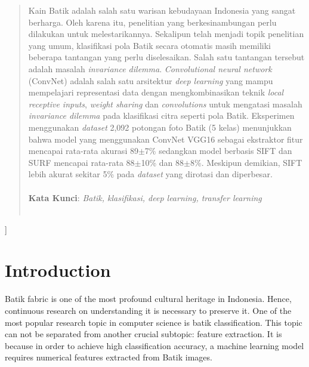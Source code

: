 \documentclass[conference, compsoc]{IEEEtran}
\begin{document}
{	\renewcommand{\abstractname}{Abstrak}
	\begin{abstract}
		\noindent
		\normalfont 
		Kain Batik adalah salah satu warisan kebudayaan Indonesia yang sangat berharga. Oleh karena itu, penelitian yang berkesinambungan perlu dilakukan untuk melestarikannya. Sekalipun telah menjadi topik penelitian yang umum, klasifikasi pola Batik secara otomatis masih memiliki beberapa tantangan yang perlu diselesaikan. Salah satu tantangan tersebut adalah masalah \textit{invariance dilemma}. \textit{Convolutional neural network} (ConvNet) adalah salah satu arsitektur \textit{deep learning} yang mampu mempelajari representasi data dengan mengkombinasikan teknik \textit{local receptive inputs}, \textit{weight sharing} dan \textit{convolutions} untuk mengatasi masalah \textit{invariance dilemma} pada klasifikasi citra seperti pola Batik. Eksperimen menggunakan \textit{dataset} 2,092 potongan foto Batik (5 kelas) menunjukkan bahwa model yang menggunakan ConvNet VGG16 sebagai ekstraktor fitur mencapai rata-rata akurasi 89$\pm$7\% sedangkan model berbasis SIFT dan SURF mencapai rata-rata 88$\pm$10\% dan 88$\pm$8\%. Meskipun demikian, SIFT lebih akurat sekitar 5\% pada \textit{dataset} yang dirotasi dan diperbesar.
		\\\\
		\noindent
		\textbf{Kata Kunci}: \textit{Batik, klasifikasi, deep learning, transfer learning} \\\\
	\end{abstract}
	
}
]

%
\IEEEpeerreviewmaketitle

\section{Introduction}

Batik fabric is one of the most profound cultural heritage in Indonesia. Hence, continuous research on understanding it is necessary to preserve it. One of the most popular research topic in computer science is batik classification. This topic can not be separated from another crucial subtopic: feature extraction. It is because in order to achieve high classification accuracy, a machine learning model requires numerical features extracted from Batik images.
\end{document}
